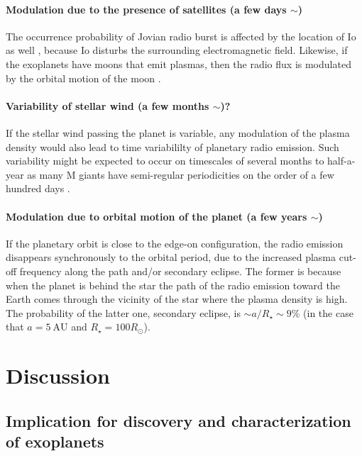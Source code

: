 \documentclass[iop,numberedappendix,apj]{emulateapj}
\begin{document}
\paragraph{Modulation due to the presence of satellites (a few days $\sim $)}
The occurrence probability of Jovian radio burst is affected by the location of Io as well \citep{dessler1983}, because Io disturbs the surrounding electromagnetic field. 
Likewise, if the exoplanets have moons that emit plasmas, then the radio flux is  modulated by the orbital motion of the moon \citep[see e.g.,][]{noyola2014}. 

\paragraph{Variability of stellar wind (a few months $\sim $)?}
If the stellar wind passing the planet is variable, any modulation of the plasma density would also lead to time variabililty of planetary radio emission.  Such variability might be expected to occur on timescales of several months to half-a-year as many M giants have semi-regular periodicities on the order of a few hundred days \citep{Kiss:1999aa}.

%
\paragraph{Modulation due to orbital motion of the planet (a few years $\sim $)}
If the planetary orbit is close to the edge-on configuration, the radio emission disappears synchronously to the orbital period, due to the increased plasma cut-off frequency along the path and/or secondary eclipse.
The former is because when the planet is behind the star the path of the radio emission toward the Earth comes through the vicinity of the star where the plasma density is high.
The probability of the latter one, secondary eclipse, is $\sim a/R_\star \sim 9$\% (in the case that $a=5~\mathrm{AU}$ and $R_{\star}=100R_{\odot }$). 
%



\section{Discussion}
\label{s:discussion}


\subsection{Implication for discovery and characterization of exoplanets}
\label{ss:implication}
\end{document}
